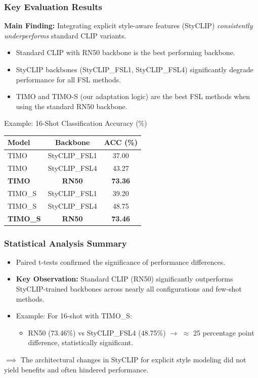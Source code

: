 \documentclass{beamer}
\begin{document}
\begin{frame}
  \frametitle{Key Evaluation Results}
  \textbf{Main Finding:} Integrating explicit style-aware features (StyCLIP) \textit{consistently underperforms} standard CLIP variants.

  \begin{itemize}
    \item Standard CLIP with RN50 backbone is the best performing backbone.
    \item StyCLIP backbones (StyCLIP\_FSL1, StyCLIP\_FSL4) significantly degrade performance for all FSL methods.
    \item TIMO and TIMO-S (our adaptation logic) are the best FSL methods when using the standard RN50 backbone.
  \end{itemize}

  \begin{block}{Example: 16-Shot Classification Accuracy (\%)}
    \centering
    \tiny
    \begin{tabular}{@{}lcc@{}}
      \toprule
      \textbf{Model} & \textbf{Backbone} & \textbf{ACC (\%)} \\
      \midrule
      TIMO           & StyCLIP\_FSL1 & 37.00 \\
      TIMO           & StyCLIP\_FSL4 & 43.27 \\
      \textbf{TIMO}  & \textbf{RN50}      & \textbf{73.36} \\
      \midrule
      TIMO\_S  & StyCLIP\_FSL1 & 39.20 \\
      TIMO\_S  & StyCLIP\_FSL4 & 48.75 \\
      \textbf{TIMO\_S } & \textbf{RN50}      & \textbf{73.46} \\
      \bottomrule
    \end{tabular}
    \normalsize
  \end{block}
\end{frame}

\begin{frame}
    \frametitle{Statistical Analysis Summary}
    \begin{itemize}
        \item Paired t-tests confirmed the significance of performance differences.
        \item \textbf{Key Observation:} Standard CLIP (RN50) significantly outperforms StyCLIP-trained backbones across nearly all configurations and few-shot methods.
        \item Example: For 16-shot with TIMO\_S:
        \begin{itemize}
            \item RN50 (73.46\%) vs StyCLIP\_FSL4 (48.75\%) $\rightarrow$ $\approx$ 25 percentage point difference, statistically significant.
        \end{itemize}
    \end{itemize}
    $\implies$ The architectural changes in StyCLIP for explicit style modeling did not yield benefits and often hindered performance.
\end{frame}
\end{document}
